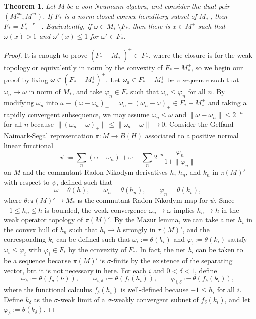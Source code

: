 \documentclass[noamsfonts,a4paper,10pt]{amsart}
\theoremstyle{plain}
\newtheorem{thm}{Theorem}[section]
\theoremstyle{definition}
\theoremstyle{remark}
\begin{document}
\begin{thm}
Let $M$ be a von Neumann algebra, and consider the dual pair $(M_*^{sa},M^{sa})$.
If $F_*$ is a norm closed convex hereditary subset of $M_*^+$, then $F_*=F_*^{r+r+}$.
Equivalently, if $\omega\in M_*^+\setminus F_*$, then there is $x\in M^+$ such that $\omega(x)>1$ and $\omega'(x)\le1$ for $\omega'\in F_*$.
\end{thm}
\begin{proof}
It is enough to prove $(\overline{F_*-M_*^+})^+\subset F_*$, where the closure is for the weak topology or equivalently in norm by the convexity of $F_*-M_*^+$, so we begin our proof by fixing $\omega\in(\overline{F_*-M_*^+})^+$.
Let $\omega_n\in F_*-M_*^+$ be a sequence such that $\omega_n\to\omega$ in norm of $M_*$, and take $\varphi_n\in F_*$ such that $\omega_n\le\varphi_n$ for all $n$.
By modifying $\omega_n$ into $\omega-(\omega-\omega_n)_+=\omega_n-(\omega_n-\omega)_+\in F_*-M_*^+$ and taking a rapidly convergent subsequence, we may assume $\omega_n\le\omega$ and $\|\omega-\omega_n\|\le2^{-n}$ for all $n$ because $\|(\omega_n-\omega)_+\|\le\|\omega_n-\omega\|\to0$.
Consider the Gelfand-Naimark-Segal representation $\pi:M\to B(H)$ associated to a positive normal linear functional \[\psi:=\sum_n(\omega-\omega_n)+\omega+\sum_n2^{-n}\frac{\varphi_n}{1+\|\varphi_n\|}\]
on $M$ and the commutant Radon-Nikodym derivatives $h$, $h_n$, and $k_n$ in $\pi(M)'$ with respect to $\psi$, defined such that
\[\omega=\theta(h),\qquad\omega_n=\theta(h_n),\qquad\varphi_n=\theta(k_n),\]
where $\theta:\pi(M)'\to M_*$ is the commutant Radon-Nikodym map for $\psi$.
Since $-1\le h_n\le h$ is bounded, the weak convergence $\omega_n\to\omega$ implies $h_n\to h$ in the weak operator topology of $\pi(M)'$.
By the Mazur lemma, we can take a net $h_i$ in the convex hull of $h_n$ such that $h_i\to h$ strongly in $\pi(M)'$, and the corresponding $k_i$ can be defined such that $\omega_i:=\theta(h_i)$ and $\varphi_i:=\theta(k_i)$ satisfy $\omega_i\le\varphi_i$ with $\varphi_i\in F_*$ by the convexity of $F_*$.
In fact, the net $h_i$ can be taken to be a sequence because $\pi(M)'$ is $\sigma$-finite by the existence of the separating vector, but it is not necessary in here.
For each $i$ and $0<\delta<1$, define
\[\omega_\delta:=\theta(f_\delta(h)),\qquad\omega_{i,\delta}:=\theta(f_\delta(h_i)),\qquad\varphi_{i,\delta}:=\theta(f_\delta(k_i)),\]
where the functional calculus $f_\delta(h_i)$ is well-defined because $-1\le h_i$ for all $i$.
Define $k_\delta$ as the $\sigma$-weak limit of a $\sigma$-weakly convergent subnet of $f_\delta(k_i)$, and let $\varphi_\delta:=\theta(k_\delta)$.

\end{proof}
\end{document}
